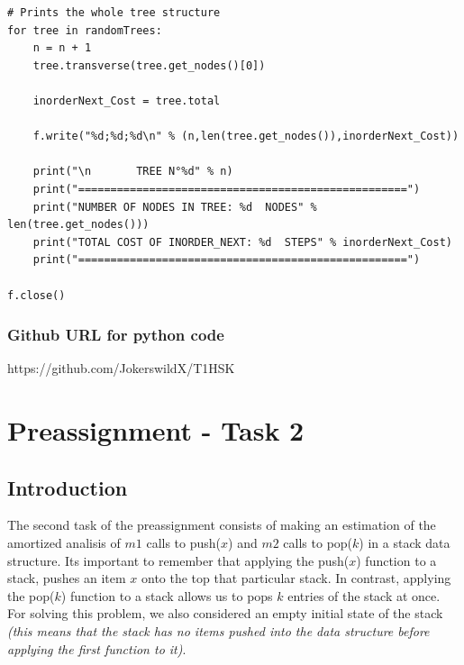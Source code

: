 \documentclass[12p]{report}
\begin{document}
\begin{lstlisting}
# Prints the whole tree structure
for tree in randomTrees:
	n = n + 1
	tree.transverse(tree.get_nodes()[0])

	inorderNext_Cost = tree.total

	f.write("%d;%d;%d\n" % (n,len(tree.get_nodes()),inorderNext_Cost))

	print("\n		TREE N°%d" % n)
	print("===================================================")
	print("NUMBER OF NODES IN TREE: %d  NODES" % len(tree.get_nodes()))
	print("TOTAL COST OF INORDER_NEXT: %d  STEPS" % inorderNext_Cost)
	print("===================================================")	

f.close()
\end{lstlisting}
 
\bigskip

  \subsection{Github URL for python code}
https://github.com/JokerswildX/T1HSK



  \chapter{Preassignment - Task 2}			%

 
  \section{Introduction}			%

  \large The second task of the preassignment consists of making an estimation of the amortized analisis of $m1$ calls to push($x$) and $m2$ calls to pop($k$) in a stack data structure. Its important to remember that applying the push($x$) function to a stack, pushes an item $x$ onto the top that particular stack. In contrast, applying the pop($k$) function to a stack allows us to pops $k$ entries of the stack at once. For solving this problem, we also considered an empty initial state of the stack \textit{(this means that the stack has no items pushed into the data structure before applying the first function to it)}. 
\end{document}
